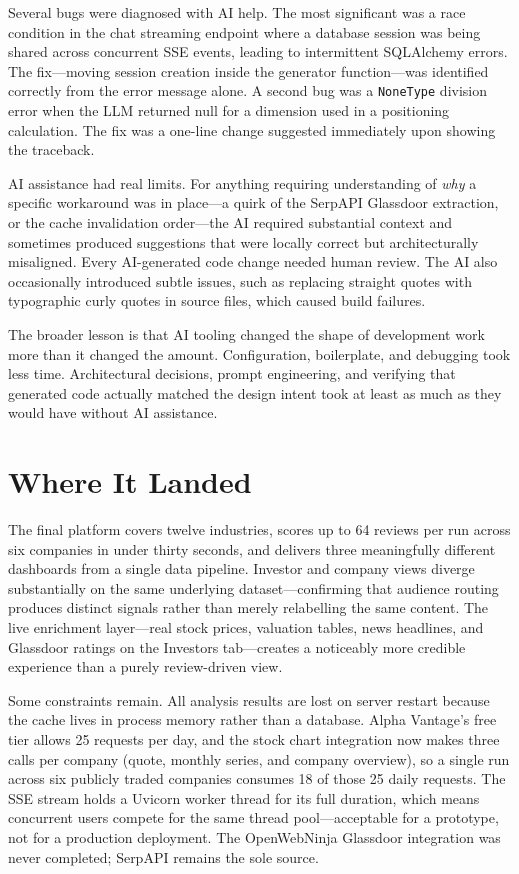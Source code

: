 \documentclass[9pt, a4paper, twocolumn]{article}
\begin{document}
Several bugs were diagnosed with AI help. The most significant was a race condition in the chat streaming endpoint where a database session was being shared across concurrent SSE events, leading to intermittent SQLAlchemy errors. The fix---moving session creation inside the generator function---was identified correctly from the error message alone. A second bug was a \texttt{NoneType} division error when the LLM returned null for a dimension used in a positioning calculation. The fix was a one-line change suggested immediately upon showing the traceback.

AI assistance had real limits. For anything requiring understanding of \textit{why} a specific workaround was in place---a quirk of the SerpAPI Glassdoor extraction, or the cache invalidation order---the AI required substantial context and sometimes produced suggestions that were locally correct but architecturally misaligned. Every AI-generated code change needed human review. The AI also occasionally introduced subtle issues, such as replacing straight quotes with typographic curly quotes in source files, which caused build failures.

The broader lesson is that AI tooling changed the shape of development work more than it changed the amount. Configuration, boilerplate, and debugging took less time. Architectural decisions, prompt engineering, and verifying that generated code actually matched the design intent took at least as much as they would have without AI assistance.

\section{Where It Landed}

The final platform covers twelve industries, scores up to 64 reviews per run across six companies in under thirty seconds, and delivers three meaningfully different dashboards from a single data pipeline. Investor and company views diverge substantially on the same underlying dataset---confirming that audience routing produces distinct signals rather than merely relabelling the same content. The live enrichment layer---real stock prices, valuation tables, news headlines, and Glassdoor ratings on the Investors tab---creates a noticeably more credible experience than a purely review-driven view.

Some constraints remain. All analysis results are lost on server restart because the cache lives in process memory rather than a database. Alpha Vantage's free tier allows 25 requests per day, and the stock chart integration now makes three calls per company (quote, monthly series, and company overview), so a single run across six publicly traded companies consumes 18 of those 25 daily requests. The SSE stream holds a Uvicorn worker thread for its full duration, which means concurrent users compete for the same thread pool---acceptable for a prototype, not for a production deployment. The OpenWebNinja Glassdoor integration was never completed; SerpAPI remains the sole source.
\end{document}
